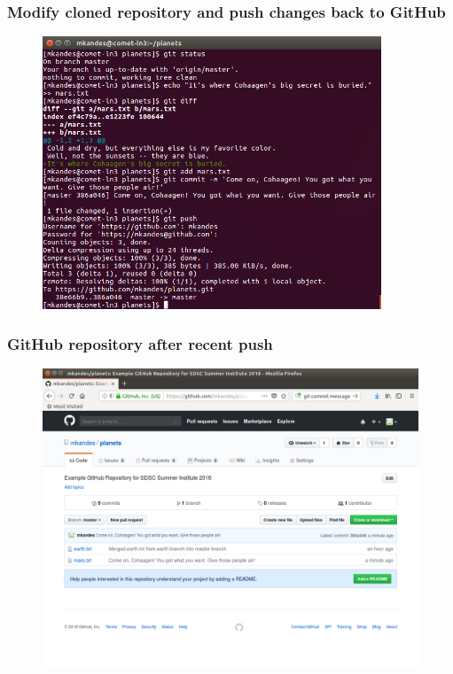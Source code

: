\documentclass{beamer}
\begin{document}
\begin{frame}
   \frametitle{Modify cloned repository and push changes back to GitHub}
   \begin{figure}[htbp]
      \includegraphics[width=0.9\textwidth]{images/git-push-from-comet.png}
   \end{figure}
\end{frame}

\begin{frame}
   \frametitle{GitHub repository after recent push}
   \begin{figure}[htbp]
      \includegraphics[width=1.0\textwidth]{images/github-after-push-from-comet.png}
   \end{figure}
\end{frame}
\end{document}
